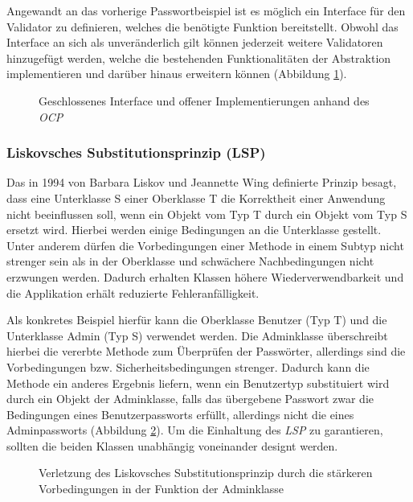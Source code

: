 \documentclass[conference]{IEEEtran}
\begin{document}
Angewandt an das vorherige Passwortbeispiel ist es möglich ein Interface für den Validator zu definieren, welches die benötigte Funktion bereitstellt. Obwohl das Interface an sich als unveränderlich gilt können jederzeit weitere Validatoren hinzugefügt werden, welche die bestehenden Funktionalitäten der Abstraktion implementieren und darüber hinaus erweitern können (Abbildung \ref{fig:OCP}). 

\begin{figure}[htbp]
	\small
	
	\caption{Geschlossenes Interface und offener Implementierungen anhand des \emph{OCP}}
	\label{fig:OCP}
\end{figure}



\subsubsection{Liskovsches Substitutionsprinzip (LSP)} Das in 1994 von Barbara Liskov und Jeannette Wing definierte Prinzip besagt, dass eine Unterklasse S einer Oberklasse T die Korrektheit einer Anwendung nicht beeinflussen soll, wenn ein Objekt vom Typ T durch ein Objekt vom Typ S ersetzt wird. Hierbei werden einige Bedingungen an die Unterklasse gestellt. Unter anderem dürfen die Vorbedingungen einer Methode in einem Subtyp nicht strenger sein als in der Oberklasse und schwächere Nachbedingungen nicht erzwungen werden. Dadurch erhalten Klassen höhere Wiederverwendbarkeit und die Applikation erhält reduzierte Fehleranfälligkeit. \cite{Leavens.2000} \cite{Martin.2018}

Als konkretes Beispiel hierfür kann die Oberklasse Benutzer (Typ T) und die Unterklasse Admin (Typ S) verwendet werden. Die Adminklasse überschreibt hierbei die vererbte Methode zum Überprüfen der Passwörter, allerdings sind die Vorbedingungen bzw. Sicherheitsbedingungen strenger. Dadurch kann die Methode ein anderes Ergebnis liefern, wenn ein Benutzertyp substituiert wird durch ein Objekt der Adminklasse, falls das übergebene Passwort zwar die Bedingungen eines Benutzerpassworts erfüllt, allerdings nicht die eines Adminpassworts (Abbildung \ref{fig:VorLSP}). Um die Einhaltung des \emph{LSP} zu garantieren, sollten die beiden Klassen unabhängig voneinander designt werden.


\begin{figure}[htbp]
	\small
	
	\caption{Verletzung des Liskovsches Substitutionsprinzip durch die stärkeren Vorbedingungen in der Funktion der Adminklasse }
	\label{fig:VorLSP}
\end{figure}
\end{document}
